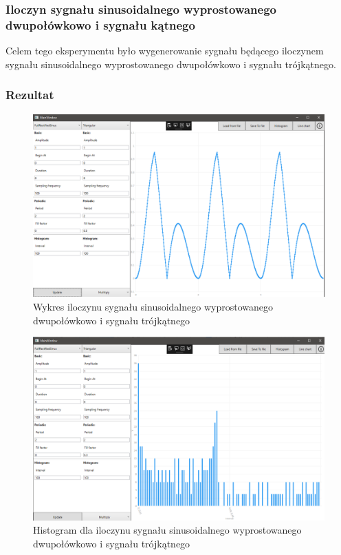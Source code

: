 \documentclass[12pt]{article}
\begin{document}
\subsubsection{Iloczyn sygnału sinusoidalnego wyprostowanego dwupołówkowo i sygnału 
kątnego}
Celem tego eksperymentu było wygenerowanie sygnału będącego iloczynem sygnału sinusoidalnego wyprostowanego dwupołówkowo i sygnału trójkątnego.


\subsubsection{Rezultat}

\begin{figure}[H]
 \centering
 \includegraphics[width=14cm]{images/mulfulltrian1.PNG}
 \vspace{-0.3cm}
 \caption{Wykres  iloczynu sygnału sinusoidalnego wyprostowanego dwupołówkowo i sygnału trójkątnego}
 \label{gui}
\end{figure}

\begin{figure}[H]
 \centering
 \includegraphics[width=14cm]{images/mulfulltrian1hist.PNG}
 \vspace{-0.3cm}
 \caption{Histogram dla iloczynu sygnału sinusoidalnego wyprostowanego dwupołówkowo i sygnału trójkątnego}
 \label{gui}
\end{figure}
\end{document}
